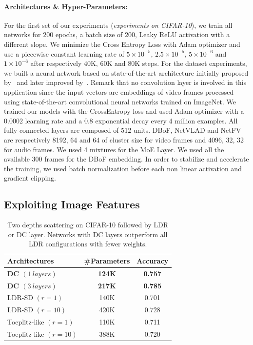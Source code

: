 \paragraph{Architectures \& Hyper-Parameters:} 
For the first set of our experiments (\emph{experiments on CIFAR-10}), we train all networks for 200 epochs, a batch size of 200, Leaky ReLU activation with a different slope.
We minimize the Cross Entropy Loss with Adam optimizer and use a piecewise constant learning rate of $5 \times 10^{-5}$, $2.5\times10^{-5}$, $5\times10^{-6}$ and $1\times10^{-6}$ after respectively 40K, 60K and 80K steps.
For the \yt dataset experiments, we built a neural network based on state-of-the-art architecture initially proposed by~\citet{abu2016youtube} and later improved by~\citet{miech2017learnable}.
Remark that no convolution layer is involved in this application since the input vectors are embeddings of video frames processed using state-of-the-art convolutional neural networks trained on ImageNet.
We trained our models with the CrossEntropy loss and used Adam optimizer with a 0.0002 learning rate and a 0.8 exponential decay every 4 million examples.
All fully connected layers are composed of 512 units.
DBoF, NetVLAD and NetFV are respectively 8192, 64 and 64 of cluster size for video frames and 4096, 32, 32 for audio frames.
We used 4 mixtures for the MoE Layer.
We used all the available 300 frames for the DBoF embedding.
In order to stabilize and accelerate the training, we used batch normalization before each non linear activation and gradient clipping. 


\subsection{Exploiting Image Features}

\begin{table}[htb]
  \centering
  \begin{tabular}{lcc}
    \toprule
    \textbf{Architectures} & \textbf{\#Parameters} & \textbf{Accuracy}  \\
    \midrule
    \textbf{DC $(1\ layers)$} & \textbf{124K} & \textbf{0.757} \\
    \textbf{DC $(3\ layers)$} & \textbf{217K} & \textbf{0.785} \\
    LDR-SD $(r=1)$ & 140K & 0.701 \\
    LDR-SD $(r=10)$ & 420K & 0.728 \\
    Toeplitz-like $(r=1)$ & 110K & 0.711 \\
    Toeplitz-like $(r=10)$ & 388K & 0.720 \\
    \bottomrule
    \end{tabular}
    \caption{Two depths scattering on CIFAR-10 followed by LDR or DC layer. Networks with DC layers outperform all LDR configurations with fewer weights.}
    \label{table:ch4-xp_ldr_scattering}
\end{table}




